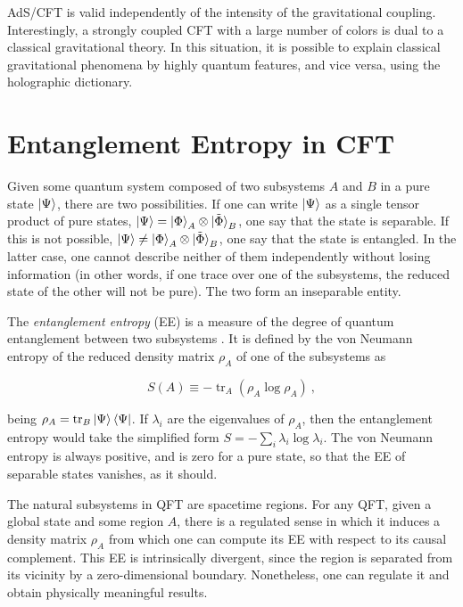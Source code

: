 \documentclass[twocolumn]{revtex4}
\providecommand{\eq}[2]{
    \begin{equation}
        #2
    \label{eq:#1}
    \end{equation}
}
\DeclareMathOperator{\tr}{tr}
\begin{document}
AdS/CFT is valid independently of the intensity of the gravitational coupling. Interestingly, a strongly coupled CFT with a large number of colors is dual to a classical gravitational theory. %
In this situation, it is possible to explain classical gravitational phenomena by highly quantum features, and vice versa, using the holographic dictionary.


\section{Entanglement Entropy in CFT} \label{s:EE_CFT}

Given some quantum system composed of two subsystems $A$ and $B$ in a pure state $\ket{\Psi}$, there are two possibilities. If one can write $\ket{\Psi}$ as a single tensor product of pure states, $\ket{\Psi} = \ket{\Phi}_A \otimes \ket{\tilde{\Phi}}_B$, one say that the state is separable. If this is not possible, $\ket{\Psi} \neq \ket{\Phi}_A \otimes \ket{\tilde{\Phi}}_B$, one say that the state is entangled.
In the latter case, one cannot describe neither of them independently without losing information (in other words, if one trace over one of the subsystems, the reduced state of the other will not be pure). The two form an inseparable entity.

The \emph{entanglement entropy} (EE) is a measure of the degree of quantum entanglement between two subsystems \cite{nishioka_entanglement_2018}. It is defined by the von Neumann entropy of the reduced density matrix $\rho_A$ of one of the subsystems as
\eq{EE}{
    S(A) \equiv - \tr_A ( \rho_A \log \rho_A ) \ ,
}
being $\rho_A = \tr_B \ket{\Psi}\bra{\Psi}$. If $\lambda_i$ are the eigenvalues of $\rho_A$, then the entanglement entropy would take the simplified form $S = - \sum_i \lambda_i \log \lambda_i$. The von Neumann entropy is always positive, and is zero for a pure state, so that the EE of separable states vanishes, as it should. 


The natural subsystems in QFT are spacetime regions. For any QFT, given a global state and some region $A$, there is a regulated sense in which it induces a density matrix $\rho_A$ from which one can compute its EE with respect to its causal complement.
This EE is intrinsically divergent, since the region is separated from its vicinity by a zero-dimensional boundary. Nonetheless, one can regulate it and obtain physically meaningful results.
\end{document}
